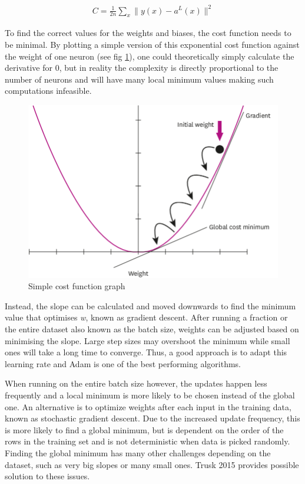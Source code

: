 \documentclass[proposal]{softeng}
\begin{document}
\begin{eqnarray}
\label{cost_function}
  C = \frac{1}{2n} \sum_x \|y(x)-a^L(x)\|^2
\end{eqnarray}

To find the correct values for the weights and biases,  the cost function needs to be minimal. By plotting a simple version of this exponential cost function against the weight of one neuron (see fig \ref{fig:costfuntiongraph}), one could theoretically simply calculate the derivative for 0, but in reality the complexity is directly proportional to the number of neurons and will have many local minimum values making such computations infeasible.

\begin{figure}[h!]
\centering
  \includegraphics[scale=0.2]{images/A-graph-of-a-cost-function-modified-from.png}
  \caption{Simple cost function graph\cite{costfuntion}}
  \label{fig:costfuntiongraph}
\end{figure}

Instead, the slope can be calculated and moved downwards to find the minimum value that optimises \textit{w}, known as gradient descent. After running  a fraction or the entire dataset also known as the batch size, weights can be adjusted based on minimising the slope.  Large step sizes may overshoot the minimum while small ones will take a long time to converge. Thus, a  good approach is to adapt this learning rate and Adam\cite{kingma2014adam} is one of the best performing algorithms.

When running on the entire batch size however, the updates happen less frequently and a local minimum is more likely to be chosen instead of the global one. An alternative is to optimize weights after each input in the training data, known as stochastic gradient descent. Due to the increased update frequency, this is more likely to find a global  minimum, but is dependent on the order of the rows in the training set and is not deterministic when data is picked randomly. Finding the global minimum has many other challenges depending on the dataset, such as very big slopes or many small ones. Trusk 2015 \cite{trask} provides possible solution to these issues.
\end{document}
